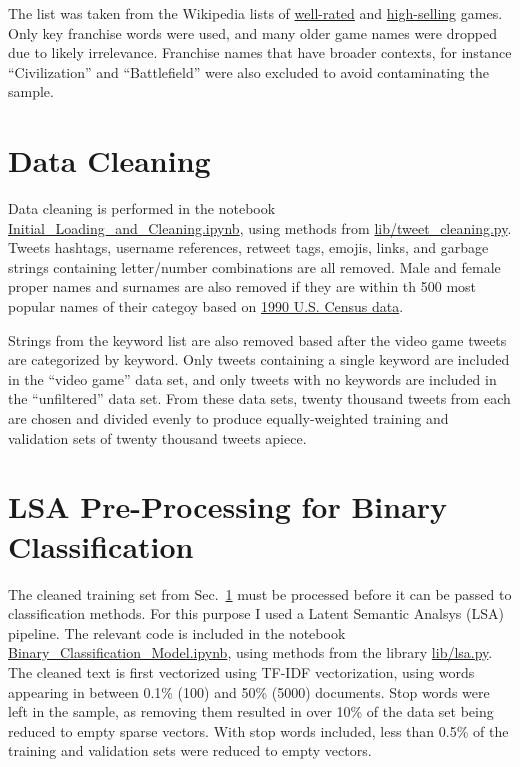 \documentclass[11pt]{revtex4-1}
\newcommand{\secref}[1]{Sec.~\ref{sec:#1}}
\begin{document}
\noindent The list was taken from the Wikipedia lists of
\href{http://en.wikipedia.org/wiki/List_of_video_games_considered_the_best}{well-rated}
and
\href{http://en.wikipedia.org/wiki/List_of_best-selling_video_games}{high-selling}
games.  Only key franchise words were used, and many older game names
were dropped due to likely irrelevance.  Franchise names that have
broader contexts, for instance ``Civilization'' and ``Battlefield''
were also excluded to avoid contaminating the sample.





\section{Data Cleaning}
\label{sec:cleaning}

Data cleaning is performed in the notebook
\href{http://github.com/davidsanford/DSI_Capstone/blob/master/Initial_Loading_and_Cleaning.ipynb}{Initial\_Loading\_and\_Cleaning.ipynb},
using methods from
\href{http://github.com/davidsanford/DSI_Capstone/blob/master/lib/tweet_cleaning.py}{lib/tweet\_cleaning.py}.
Tweets hashtags, username references, retweet tags, emojis, links, and
garbage strings containing letter/number combinations are all removed.
Male and female proper names and surnames are also removed if they are
within th 500 most popular names of their categoy based on
\href{http://catalog.data.gov/dataset/names-from-census-1990}{1990
  U.S. Census data}.

Strings from the keyword list are also removed based after the video
game tweets are categorized by keyword.  Only tweets containing a
single keyword are included in the ``video game'' data set, and only
tweets with no keywords are included in the ``unfiltered'' data set.
From these data sets, twenty thousand tweets from each are chosen and
divided evenly to produce equally-weighted training and validation
sets of twenty thousand tweets apiece.





\section{LSA Pre-Processing for Binary Classification}
\label{sec:lsa}

The cleaned training set from \secref{cleaning} must be processed
before it can be passed to classification methods.  For this purpose I
used a Latent Semantic Analsys (LSA) pipeline.  The relevant code is
included in the notebook
\href{http://github.com/davidsanford/DSI_Capstone/Binary_Classification_Model.ipynb}{Binary\_Classification\_Model.ipynb},
using methods from the library
\href{http://github.com/davidsanford/DSI_Capstone/lib/lsa.py}{lib/lsa.py}.
The cleaned text is first vectorized using TF-IDF vectorization, using
words appearing in between 0.1\% (100) and 50\% (5000) documents.
Stop words were left in the sample, as removing them resulted in over
10\% of the data set being reduced to empty sparse vectors.  With stop
words included, less than 0.5\% of the training and validation sets
were reduced to empty vectors.
\end{document}
